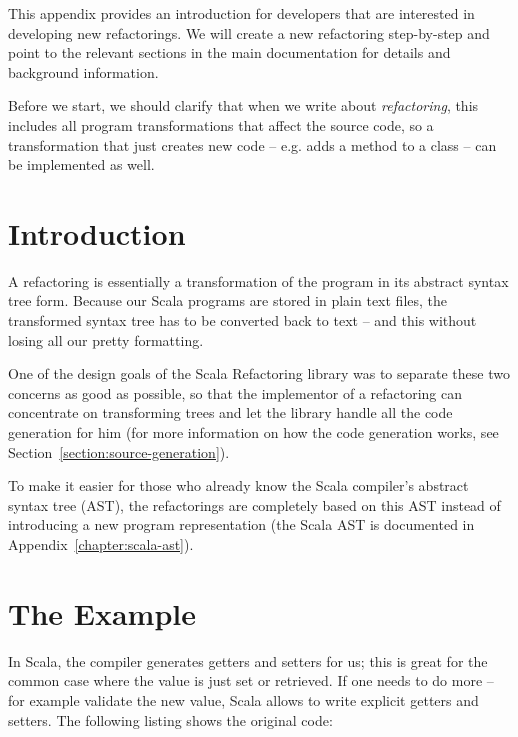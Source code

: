 \documentclass[10pt,a4paper,oneside]{scrreprt}
\begin{document}
This appendix provides an introduction for developers that are interested in developing new refactorings. We will create a new refactoring step-by-step and point to the relevant sections in the main documentation for details and background information. 


Before we start, we should clarify that when we write about \textit{refactoring}, this includes all program transformations that affect the source code, so a transformation that just creates new code -- e.g. adds a method to a class -- can be implemented as well.

\section{Introduction}

A refactoring is essentially a transformation of the program in its abstract syntax tree form. Because our Scala programs are stored in plain text files, the transformed syntax tree has to be converted back to text -- and this without losing all our pretty formatting. 

One of the design goals of the Scala Refactoring library was to separate these two concerns as good as possible, so that the implementor of a refactoring can concentrate on transforming trees and let the library handle all the code generation for him (for more information on how the code generation works, see Section~\vref{section:source-generation}). 

To make it easier for those who already know the Scala compiler's abstract syntax tree (AST), the refactorings are completely based on this AST instead of introducing a new program representation (the Scala AST is documented in Appendix~\vref{chapter:scala-ast}). 

\section{The Example}

In Scala, the compiler generates getters and setters for us; this is great for the common case where the value is just set or retrieved. If one needs to do more -- for example validate the new value, Scala allows to write explicit getters and setters. The following listing shows the original code:
\end{document}
